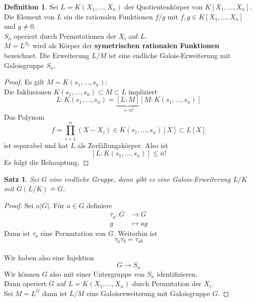 \documentclass[10pt,a4paper]{article}
\newcommand{\abs}[1]{\left|#1\right|}
\newcommand{\isom}{\overset{\sim}{=}}
\theoremstyle{plain}
\newtheorem{satz}[theorem]{Satz}
\theoremstyle{definition}
\newtheorem{definition}[theorem]{Definition}
\theoremstyle{remark}
\begin{document}
	\begin{definition}
		Sei $L=K(X_1,...,X_n)$ der Quotientenkörper von $K[X_1,...,X_n]$. Die Element von $L$ sin die rationalen Funktionen $f/g$ mit $f,g\in K[X_1,...,X_n]$ und $g\neq 0$.\\
		$S_n$ operiert durch Permutationen der $X_i$ auf $L$.\\
		$M=L^{S_n}$ wird als Körper der \textbf{symetrischen rationalen Funktionen} bezeichnet.
		Die Erweiterung $L/M$ ist eine endliche Galois-Erweiterung mit Galoisgruppe $S_n$.
	\end{definition}
	\begin{proof}
		Es gilt $M=K(s_1,...,s_n)$:\\
		Die Inklusionen $K(s_1,...,s_n)\subset M\subset L$ impliziert
		\[L:K(s_1,...,s_n)=\underbrace{[L:M]}_{=n!}[M:K(s_1,...,s_n)]\]
		Das Polynom
		\[f=\prod_{i=1}^{n}(X-X_i)\in K(s_1,...,s_n)[X]\subset L[X]\]
		ist separabel und hat $L$ als Zerfällungskörper. Also ist
		\[[L:K(s_1,...,s_n)]\leq n!\]
		Es folgt die Behauptung.
	\end{proof}
	
	\begin{satz}
		Sei $G$ eine endliche Gruppe, dann gibt es eine Galois-Erweiterung $L/K$ mit $G(L/K)\isom G$.
	\end{satz}
	\begin{proof}
		Sei $n\abs{G}$. Für $a\in G$ definiere
		\begin{align*}
		\tau_a:G&\to G\\
		g&\mapsto ag
		\end{align*}
		Dann ist $\tau_a$ eine Permutation von $G$. Weiterhin ist
		\[\tau_{a}\tau_b=\tau_{ab}\]\\
		Wir haben also eine Injektion
		\[G\to S_n\]
		Wir können $G$ also mit einer Untergruppe von $S_n$ identifizieren.\\
		Dann operiert $G$ auf $L=K(X_1,...,X_n)$ durch Permutation der $X_i$.\\
		Sei $M=L^G$ dann ist $L/M$ eine Galoiserweiterung mit Galoisgruppe $G$.
	\end{proof}
	
	
	
	
\end{document}
